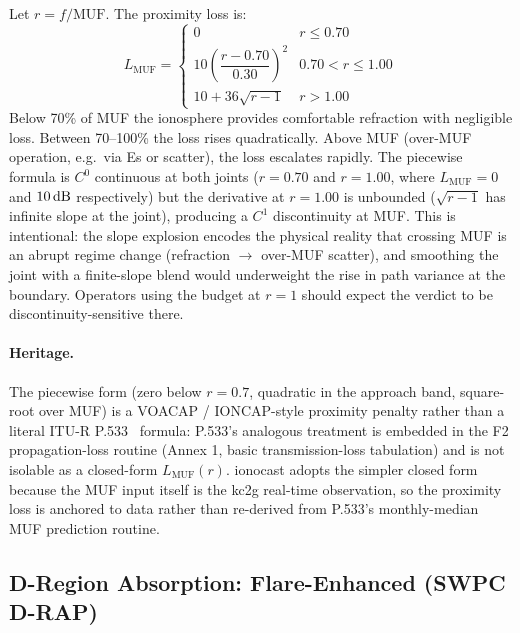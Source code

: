 \documentclass[11pt,a4paper]{article}
\newcommand{\SI}[2]{#1\,\text{#2}}
\newcommand{\dB}{\text{dB}}
\begin{document}
Let $r = f / \text{MUF}$.  The proximity loss is:
\begin{equation}\label{eq:lmuf}
  L_{\text{MUF}} =
  \begin{cases}
    0 & r \leq 0.70 \\[4pt]
    10\!\left(\dfrac{r - 0.70}{0.30}\right)^{\!2}
      & 0.70 < r \leq 1.00 \\[6pt]
    10 + 36\sqrt{r - 1}
      & r > 1.00
  \end{cases}
\end{equation}
Below 70\% of MUF the ionosphere provides comfortable refraction with
negligible loss.  Between 70--100\% the loss rises quadratically.
Above MUF (over-MUF operation, e.g.\ via Es or scatter), the loss
escalates rapidly.  The piecewise formula is $C^0$ continuous at
both joints ($r = 0.70$ and $r = 1.00$, where $L_{\text{MUF}} = 0$
and $\SI{10}{\dB}$ respectively) but the derivative at $r = 1.00$
is unbounded ($\sqrt{r - 1}$ has infinite slope at the joint),
producing a $C^1$ discontinuity at MUF.  This is intentional: the
slope explosion encodes the physical reality that crossing MUF is
an abrupt regime change (refraction $\to$ over-MUF scatter), and
smoothing the joint with a finite-slope blend would underweight
the rise in path variance at the boundary.  Operators using the
budget at $r = 1$ should expect the verdict to be
discontinuity-sensitive there.

\paragraph{Heritage.}  The piecewise form (zero below $r = 0.7$,
quadratic in the approach band, square-root over MUF) is a
VOACAP / IONCAP-style proximity penalty rather than a literal
ITU-R P.533~\cite{itup533} formula: P.533's analogous treatment is
embedded in the F2 propagation-loss routine (Annex 1, basic
transmission-loss tabulation) and is not isolable as a closed-form
$L_{\text{MUF}}(r)$.  ionocast adopts the simpler closed form
because the MUF input itself is the kc2g real-time observation,
so the proximity loss is anchored to data rather than re-derived
from P.533's monthly-median MUF prediction routine.

\subsection{D-Region Absorption: Flare-Enhanced (SWPC D-RAP)}\label{sec:labs}
\end{document}
